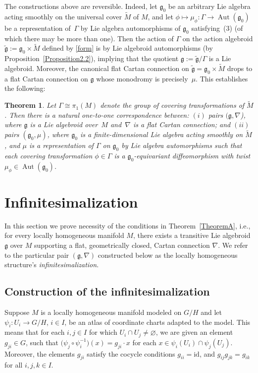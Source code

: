 \documentclass[11pt]{article}
\DeclareMathOperator{\automorphism}{Aut}
\newcommand\identity{\mathrm{id}}
\numberwithin{equation}{section}
\newtheorem{TheoremBlaom}{Theorem}[section]
\begin{document}
The constructions above are reversible. Indeed, let ${\mathfrak g}_0$
be an arbitrary Lie algebra acting smoothly on the universal cover
$\tilde M$ of $M$, and let $\phi \mapsto \mu_\phi \colon \Gamma
\rightarrow \automorphism ({\mathfrak g}_0)$ be a representation of~$\Gamma$ by Lie algebra automorphisms of ${\mathfrak g}_0$ satisfying~(3) %
(of which there may be more than one). Then the action of
$\Gamma$ on the action algebroid $\tilde {\mathfrak g} :={\mathfrak
  g}_0 \times \tilde M$ def\/ined by \eqref{form} is by Lie algebroid
automorphisms (by Proposition~\ref{Proposition2.2}), %
implying that the
quotient ${\mathfrak g}:=\tilde {\mathfrak g} /\Gamma$ is a Lie
algebroid. Moreover, the canonical f\/lat Cartan connection on $\tilde
{\mathfrak g} ={\mathfrak g}_0 \times \tilde M$ drops to a f\/lat Cartan
connection on ${\mathfrak g}$ whose monodromy is precisely~$\mu$. This
establishes the following:

\begin{TheoremBlaom}\label{Theorem2.6}
  Let $\Gamma \cong \pi_1(M)$ denote the group of covering
  transformations of $\tilde M$. Then there is a natural one-to-one
  correspondence between: $(i)$ pairs $({\mathfrak g}, \nabla$), where
  $\mathfrak g$ is a Lie algebroid over~$M$ and~$\nabla$ is a flat
  Cartan connection; and $(ii)$ pairs $({\mathfrak g}_0,\mu)$, where
  ${\mathfrak g}_0$ is a finite-dimensional Lie algebra acting
  smoothly on $\tilde M$, and $\mu$ is a representation of $\Gamma $
  on ${\mathfrak g}_0$ by Lie algebra automorphisms such that each
  covering transformation $\phi \in \Gamma $ is a ${\mathfrak g}_0
  $-equivariant diffeomorphism with twist $\mu_\phi\in
  \automorphism({\mathfrak g}_0)$.
\end{TheoremBlaom}

\section{Inf\/initesimalization}\label{sectionI}
In this section we prove necessity of the conditions in Theorem~\ref{TheoremA},
i.e., for every locally homogeneous manifold $M$, there exists a
transitive Lie algebroid ${\mathfrak g}$ over $M$ supporting a f\/lat,
geometrically closed, Cartan connection $\nabla$. We refer to the
particular pair $({\mathfrak g}, \nabla)$ constructed below as the
locally homogeneous structure's {\it infinitesimalization}.

\subsection{Construction of the
  inf\/initesimalization}\label{infinitesimalization}
Suppose $M$ is a locally homogeneous manifold modeled on $G/H$ and let
$\psi_i \colon U_i \rightarrow G/H$, $i\in I$, be an atlas of
coordinate charts adapted to the model. This means that for each $i,j
\in I$ for which $U_i\cap U_j \ne \varnothing$, we are given an element
$g_{ji}\in G$, such that $\big(\psi_j \circ \psi_i^{-1}\big)(x) = g_{ji}\cdot
x$ for each $x\in \psi_i(U_i)\cap \psi_j(U_j)$. Moreover, the elements
$g_{ji}$ satisfy the cocycle conditions $g_{ii}=\identity$, and
$g_{ij}g_{jk}=g_{ik}$ for all $i,j,k \in I$.
\end{document}
